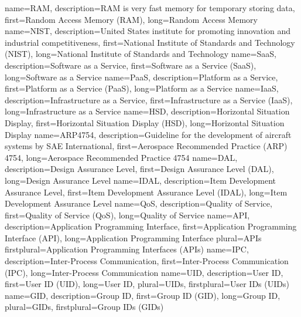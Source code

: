 {%
    name={RAM},
    description={RAM is very fast memory for temporary storing data},
    first={Random Access Memory (RAM)},
    long={Random Access Memory}
}
{%
    name={NIST},
    description={United States institute for promoting innovation and industrial competitiveness},
    first={National Institute of Standards and Technology (NIST)},
    long={National Institute of Standards and Technology}
}
{%
    name={SaaS},
    description={Software as a Service},
    first={Software as a Service (SaaS)},
    long={Software as a Service}
}
{%
    name={PaaS},
    description={Platform as a Service},
    first={Platform as a Service (PaaS)},
    long={Platform as a Service}
}
{%
    name={IaaS},
    description={Infrastructure as a Service},
    first={Infrastructure as a Service (IaaS)},
    long={Infrastructure as a Service}
}
{%
    name={HSD},
    description={Horizontal Situation Display},
    first={Horizontal Situation Display (HSD)},
    long={Horizontal Situation Display}
}
{%
    name={ARP4754},
    description={Guideline for the development of aircraft systems by SAE International},
    first={Aerospace Recommended Practice (ARP) 4754},
    long={Aerospace Recommended Practice 4754}
}
{%
    name={DAL},
    description={Design Assurance Level},
    first={Design Assurance Level (DAL)},
    long={Design Assurance Level}
}
{%
    name={IDAL},
    description={Item Development Assurance Level},
    first={Item Development Assurance Level (IDAL)},
    long={Item Development Assurance Level}
}
{%
    name={QoS},
    description={Quality of Service},
    first={Quality of Service (QoS)},
    long={Quality of Service}
}
{%
    name={API},
    description={Application Programming Interface},
    first={Application Programming Interface (API)},
    long={Application Programming Interface}
    plural={APIs}
    firstplural={Application Programming Interfaces (APIs)}
}
{%
    name={IPC},
    description={Inter-Process Communication},
    first={Inter-Process Communication (IPC)},
    long={Inter-Process Communication}
}
{%
    name={UID},
    description={User ID},
    first={User ID (UID)},
    long={User ID},
    plural={UIDs},
    firstplural={User IDs (UIDs)}
}
{%
    name={GID},
    description={Group ID},
    first={Group ID (GID)},
    long={Group ID},
    plural={GIDs},
    firstplural={Group IDs (GIDs)}
}
